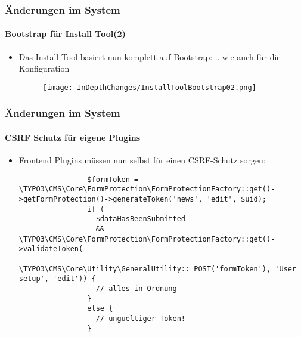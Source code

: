 
\begin{frame}[fragile]
	\frametitle{Änderungen im System}
	\framesubtitle{Bootstrap für Install Tool(2)}

	\begin{itemize}

		\item Das Install Tool basiert nun komplett auf Bootstrap: ...wie auch für die Konfiguration

			\begin{figure}
				\texttt{[image: InDepthChanges/InstallToolBootstrap02.png]}
			\end{figure}

	\end{itemize}

\end{frame}


\begin{frame}[fragile]
	\frametitle{Änderungen im System}
	\framesubtitle{CSRF Schutz für eigene Plugins}

	\lstset{basicstyle=\tiny\ttfamily}

	\begin{itemize}

		\item Frontend Plugins müssen nun selbst für einen CSRF-Schutz sorgen:

			\begin{lstlisting}
				$formToken = \TYPO3\CMS\Core\FormProtection\FormProtectionFactory::get()->getFormProtection()->generateToken('news', 'edit', $uid);
				if (
				  $dataHasBeenSubmitted
				  && \TYPO3\CMS\Core\FormProtection\FormProtectionFactory::get()->validateToken(
				    \TYPO3\CMS\Core\Utility\GeneralUtility::_POST('formToken'), 'User setup', 'edit')) {
				  // alles in Ordnung
				}
				else {
				  // ungueltiger Token!
				}
			\end{lstlisting}

	\end{itemize}

\end{frame}

